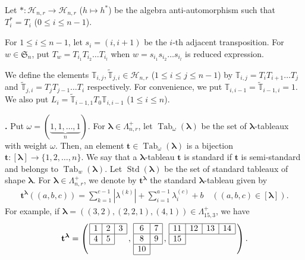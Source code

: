 \documentclass[12pt]{amsart}
\def \para{\refstepcounter{thm} \par\medskip\noindent
                \textbf{\thethm .} }
\numberwithin{equation}{thm}
\newcommand\TT{\mathbb T}
\newcommand\bt{\mathbf t}
\newcommand\fS{\mathfrak S}
\newcommand\sH{\mathscr H}
\newcommand\la{\lambda}
\newcommand\w{\omega}
\newcommand\vL{\varLambda}
\newcommand\Bla{\boldsymbol\lambda}
\newcommand\wt{\widetilde}
\newcommand\ra{\rightarrow}
\newcommand\Std{\operatorname{Std}}
\newcommand{\Tab}{\operatorname{Tab}}
\newcounter{ni}
\begin{document}
Let $\ast : \sH_{n,r} \ra \sH_{n,r}$ ($h \mapsto  h^{\ast}$) be the algebra anti-automorphism such that 
$T_i^{\ast} = T_i$ ($0 \leq i \leq n-1$). 

For $1 \leq i \leq n-1$, let $s_i =(i,i+1)$ be the $i$-th adjacent transposition. 
For $w \in \fS_n$, put $T_w = T_{i_1} T_{i_2} \dots T_{i_l}$ when $w=s_{i_1} s_{i_2} \dots s_{i_l}$ is reduced expression.  

We define the elements $\TT_{i,j}, \wt{\TT}_{j,i} \in \sH_{n,r}$ ($1 \leq i \leq j \leq n-1$) by 
$\TT_{i,j} = T_i T_{i+1} \dots T_j$ and $\wt{\TT}_{j,i} = T_j T_{j-1} \dots T_i$ respectively. 
For convenience, we put $\TT_{i,i-1} = \wt{\TT}_{i-1,i} =1$. 
We also put 
$L_i = \wt{\TT}_{i-1,1} T_0 \TT_{i,i-1}$ ($1 \leq i \leq n$). 

\para 
Put $\w=(\underbrace{1,1,\dots,1}_{n})$. 
For $\Bla \in \vL_{n,r}^+$, let $\Tab_{\w}(\Bla)$ be the set of $\Bla$-tableaux with weight $\w$. 
Then, an element $\bt \in \Tab_{\w}(\Bla)$ is a bijection $\bt: [\Bla] \ra \{1,2,\dots,n\}$. 
We say that a $\Bla$-tableau $\bt $  is standard if $\bt$ is semi-standard and belongs to $\Tab_w(\Bla)$. 
Let $\Std(\Bla)$ be the set of standard tableaux of shape $\Bla$. 
For $\Bla \in \vL_{n,r}^+$, we denote by $\bt^{\Bla}$ the standard $\Bla$-tableau given by 
\begin{align*}
\bt^{\Bla} ((a,b,c)) = \sum_{k=1}^{c-1} |\la^{(k)}| + \sum_{i=1}^{a-1} \la_i^{(c)} + b 
\quad ((a,b,c) \in [\Bla]).
\end{align*}
For example, 
if $\Bla =((3,2), (2,2,1), (4,1) ) \in \vL_{15,3}^+$, we have 
\begin{align*}
\bt^{\Bla}
= \left( \, \begin{array}{|c|c|c|} \hline 1 & 2 & 3 \\ \hline 4 & 5 \\ \cline{1-2} \multicolumn{1}{c}{} \end{array} \, , 
	\, 
	\begin{array}{|c|c|c|} \hline 6 & 7 \\ \hline 8 & 9 \\ \hline 10 \\ \cline{1-1} \end{array} \, , 
	\, 
	\begin{array}{|c|c|c|c|} \hline 11 & 12 & 13 & 14 \\ \hline 15 \\ \cline{1-1} \multicolumn{1}{c}{} \end{array} 
	\, 
	\right). 
\end{align*}
\end{document}
